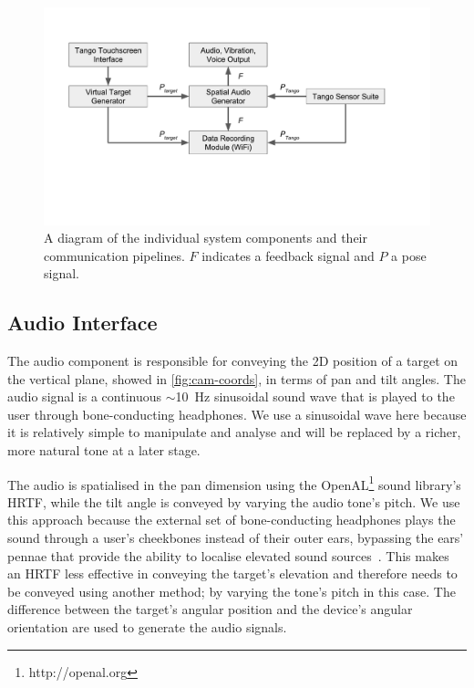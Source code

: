 \documentclass[sigconf, screen=true, anonymous=true]{acmart}
\begin{document}
\begin{figure}
  \centering
  \includegraphics[clip=true, trim=0 120 80 50, width=1.0\columnwidth]{figures/pipeline.pdf}
  \caption{A diagram of the individual system components and their communication pipelines. $F$ indicates a feedback signal and $P$ a pose signal. }\label{fig:pipeline}
\end{figure}

\subsection{Audio Interface}

The audio component is responsible for conveying the 2D position of a target on the vertical plane, showed in \cref{fig:cam-coords}, in terms of pan and tilt angles.
The audio signal is a continuous $\sim$\SI{10}{\hertz} sinusoidal sound wave that is played to the user through bone-conducting headphones.
We use a sinusoidal wave here because it is relatively simple to manipulate and analyse and will be replaced by a richer, more natural tone at a later stage. 

The audio is spatialised in the pan dimension using the OpenAL\footnote{http://openal.org} sound library's HRTF, while the tilt angle is conveyed by varying the audio tone's pitch.
We use this approach because the external set of bone-conducting headphones plays the sound through a user's cheekbones instead of their outer ears, bypassing the ears' pennae that provide the ability to localise elevated sound sources~\cite{roffler1968factors, algazi2001elevation}.
This makes an HRTF less effective in conveying the target's elevation and therefore needs to be conveyed using another method; by varying the tone's pitch in this case.
The difference between the target's angular position and the device's angular orientation are used to generate the audio signals. 
\end{document}
